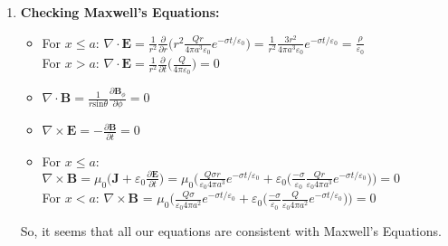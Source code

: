 \documentclass[12pt]{article}
\begin{document}
\begin{enumerate}[label=\alph*)]
    \item \textbf{Checking Maxwell's Equations:}\\
    \begin{itemize}
        \item For $x \leq a$: $\nabla \cdot \textbf{E} = \frac{1}{r^2}\frac{\partial}{\partial r}\Big(r^2 \frac{Qr}{4\pi a^3 \varepsilon_0}e^{-\sigma t/\varepsilon_0}\Big) = \frac{1}{r^2}\frac{3r^2}{4\pi a^3 \varepsilon_0}e^{-\sigma t/\varepsilon_0} = \frac{\rho}{\varepsilon_0}$\\
        For $x > a$: $\nabla \cdot \textbf{E} = \frac{1}{r^2}\frac{\partial}{\partial t}\Big(\frac{Q}{4\pi \varepsilon_0}\Big) = 0$
        \item $\nabla \cdot \textbf{B} = \frac{1}{r \text{sin}\theta}\frac{\partial \textbf{B}_\phi}{\partial \phi} = 0$
        \item $\nabla \times \textbf{E} = -\frac{\partial \textbf{B}}{\partial t} = 0$
        \item For $x \leq a$: $\nabla \times \textbf{B} = \mu_0 \Big(\textbf{J} + \varepsilon_0 \frac{\partial \textbf{E}}{\partial t}\Big) = \mu_0 \Big(\frac{Q\sigma r}{\varepsilon_0 4 \pi a^3} e^{-\sigma t/\varepsilon_0} + \varepsilon_0 \Big(\frac{-\sigma}{\varepsilon_0}\frac{Qr}{\varepsilon_0 4 \pi a^3} e^{-\sigma t/\varepsilon_0}\Big)\Big) = 0$\\
        For $x < a$: $\nabla \times \textbf{B}$ = $\mu_0\Big(\frac{Q\sigma  }{\varepsilon_0 4 \pi a^2}  e^{-\sigma t/\varepsilon_0} + \varepsilon_0\Big(\frac{-\sigma}{\varepsilon_0}\frac{Q}{\varepsilon_0 4 \pi a^2}  e^{-\sigma t/\varepsilon_0} \Big) \Big) = 0$
    \end{itemize}
    So, it seems that all our equations are consistent with Maxwell's Equations. 
\end{enumerate}
\end{document}
